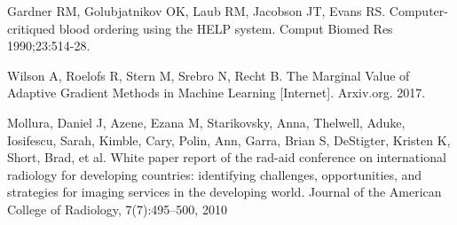 \documentclass{amia}
\begin{document}
\begin{thebibliography}{1}
Gardner RM, Golubjatnikov OK, Laub RM, Jacobson JT, Evans RS. Computer-critiqued blood ordering using the HELP system. Comput Biomed Res 1990;23:514-28.

Wilson A, Roelofs R, Stern M, Srebro N, Recht B. The Marginal Value of Adaptive Gradient Methods in Machine Learning [Internet]. Arxiv.org. 2017.

Mollura, Daniel J, Azene, Ezana M, Starikovsky, Anna, Thelwell, Aduke, Iosifescu, Sarah, Kimble, Cary, Polin, Ann, Garra, Brian S, DeStigter, Kristen K, Short, Brad, et al. White paper report of the rad-aid conference on international radiology for developing countries: identifying challenges, opportunities, and strategies for imaging services in the developing world. Journal of the American College of Radiology, 7(7):495–500, 2010
\end{thebibliography}
\end{document}
